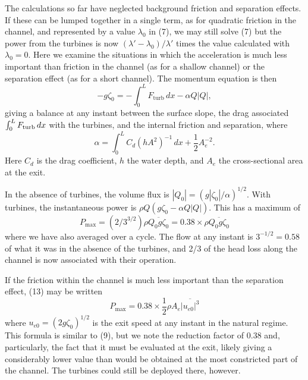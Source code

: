 \documentclass[11pt]{article}
\begin{document}
The calculations so far have neglected background friction and separation effects. If these can be lumped together in a single term, as for quadratic friction in the channel, and represented by a value $\lambda_0$ in (7), we may still solve (7) but the power from the turbines is now $(\lambda' - \lambda _0)/\lambda'$ times the value calculated with $\lambda_0 = 0$. Here we examine the situations in which the acceleration is much less important than friction in the channel (as for a shallow channel) or the separation effect (as for a short channel). The momentum equation is then
\begin{equation}
-g\zeta_0 = -\int_0^LF_\textrm{turb}\,dx - \alpha Q|Q|,
\end{equation}
giving a balance at any instant between the surface slope, the drag associated $\int_0^LF_{\rm turb}\,dx$ with the turbines, and the internal friction and separation, where
\begin{equation}
\alpha = \int_0^LC_d(hA^2)^{-1}\,dx + \frac{1}{2} A_e^{-2}.
\end{equation}
Here $C_d$ is the drag coefficient, $h$ the water depth, and $A_e$ the cross-sectional area at the exit.

In the absence of turbines, the volume flux is $|Q_0| = (g|\zeta_0|/\alpha)^{1/2}$. With turbines, the instantaneous power is $\rho Q(g\zeta_0 - \alpha Q|Q|)$. This has a maximum of
\begin{equation}
P_\textrm{max} = (2/3^{3/2})\rho \overline {Q_0g\zeta_0} = 0.38  \times 
\rho \overline {Q_0g\zeta_0}
\end{equation}
where we have also averaged over a cycle. The flow at any instant is $3^{-1/2} = 0.58$ of what it was in the absence of the turbines, and 2/3 of the head loss along the channel is now associated with their operation.

If the friction within the channel is much less important than the separation effect, (13) may be written
\begin{equation}
P_\textrm{max} = 0.38 \times \frac{1}{2}\rho A_e\overline {|u_{e0}|^3}
\end{equation}
where $u_{e0}= (2g\zeta_0)^{1/2}$ is the exit speed at any instant in the natural regime. This formula is similar to (9), but we note the reduction factor of 0.38 and, particularly, the fact that it must be evaluated at the exit, likely giving a considerably lower value than would be obtained at the most constricted part of the channel. The turbines could still be deployed there, however.
\end{document}
